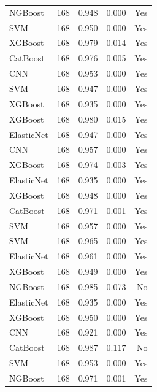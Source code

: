 \begin{table}
\begin{tabular}{lrrrr}
   NGBoost & 168 &        0.948 &     0.000 &                Yes \\
       SVM & 168 &        0.950 &     0.000 &                Yes \\
   XGBoost & 168 &        0.979 &     0.014 &                Yes \\
  CatBoost & 168 &        0.976 &     0.005 &                Yes \\
       CNN & 168 &        0.953 &     0.000 &                Yes \\
       SVM & 168 &        0.947 &     0.000 &                Yes \\
   XGBoost & 168 &        0.935 &     0.000 &                Yes \\
   XGBoost & 168 &        0.980 &     0.015 &                Yes \\
ElasticNet & 168 &        0.947 &     0.000 &                Yes \\
       CNN & 168 &        0.957 &     0.000 &                Yes \\
   XGBoost & 168 &        0.974 &     0.003 &                Yes \\
ElasticNet & 168 &        0.935 &     0.000 &                Yes \\
   XGBoost & 168 &        0.948 &     0.000 &                Yes \\
  CatBoost & 168 &        0.971 &     0.001 &                Yes \\
       SVM & 168 &        0.957 &     0.000 &                Yes \\
       SVM & 168 &        0.965 &     0.000 &                Yes \\
ElasticNet & 168 &        0.961 &     0.000 &                Yes \\
   XGBoost & 168 &        0.949 &     0.000 &                Yes \\
   NGBoost & 168 &        0.985 &     0.073 &                 No \\
ElasticNet & 168 &        0.935 &     0.000 &                Yes \\
   XGBoost & 168 &        0.950 &     0.000 &                Yes \\
       CNN & 168 &        0.921 &     0.000 &                Yes \\
  CatBoost & 168 &        0.987 &     0.117 &                 No \\
       SVM & 168 &        0.953 &     0.000 &                Yes \\
   NGBoost & 168 &        0.971 &     0.001 &                Yes \\

\end{tabular}
\end{table}

